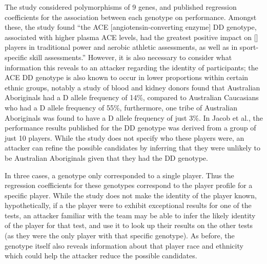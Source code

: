 The study considered polymorphisms of 9 genes, and published regression coefficients for the association between each genotype on performance. Amongst these, the study found ``the ACE [angiotensin-converting enzyme] DD genotype, associated with higher plasma ACE levels, had the greatest positive impact on [\arf{}] players in traditional power and aerobic athletic assessments, as well as in sport-specific skill assessments.'' However, it is also necessary to consider what information this reveals to an attacker regarding the identity of participants; the ACE DD genotype is also known to occur in lower proportions within certain ethnic groups, notably a study of blood and kidney donors \cite{Lester1999} found that Australian Aboriginals had a D allele frequency of 14\%, compared to Australian Caucasians who had a D allele frequency of 55\%, furthermore, one tribe of Australian Aboriginals was found to have a D allele frequency of just 3\%. In Jacob et al., the performance results published for the DD genotype was derived from a group of just 10 players. While the study does not specify who these players were, an attacker can refine the possible candidates by inferring that they were unlikely to be Australian Aboriginals given that they had the DD genotype.

In three cases, a genotype only corresponded to a single player. Thus the regression coefficients for these genotypes correspond to the player profile for a specific player. While the study does not make the identity of the player known, hypothetically, if a the player were to exhibit exceptional results for one of the tests, an attacker familiar with the team may be able to infer the likely identity of the player for that test, and use it to look up their results on the other tests (as they were the only player with that specific genotype). As before, the genotype itself also reveals information about that player race and ethnicity which could help the attacker reduce the possible candidates.


\closechapterblock
